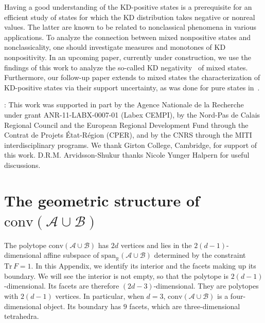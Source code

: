 \documentclass[a4paper, notitlepage, 11pt]{article}
\numberwithin{equation}{section}
\newcommand{\Acal}{{\mathcal A}}
\newcommand{\Bcal}{{\mathcal B}}
\newcommand{\spanRAB}{{\mathrm{span}_{\R}(\Acal\cup\Bcal)}}
\newcommand{\R}{\mathbb{R}}
\newcommand{\Tr}{\mathrm{Tr}\,}
\newcommand{\conv}[1]{\mathrm{conv}\left(#1\right)}
\newcommand{\convAB}{\conv{\Acal \cup \Bcal}}
\renewcommand{\thesection}{\arabic{section}}
\renewcommand{\thesubsection}{\arabic{section}.\arabic{subsection}}
\begin{document}
Having a good understanding of the KD-positive states is a prerequisite for an efficient study of states for which the KD distribution takes negative or nonreal values. The latter are known to be related to nonclassical phenomena in various applications. To analyze the connection between mixed nonpositive states and nonclassicality, one should investigate measures and monotones of KD nonpositivity. In an upcoming paper, currently under construction, we use the findings of this work to analyze the so-called KD negativity~\cite{GoHaDr19}  of mixed states. Furthermore, our follow-up paper extends to mixed states the characterization of KD-positive states via their support uncertainty, as was done for pure states in~\cite{arvidsson-shukuretal2021, debievre2021, debievre2023a}.  

 
 




\medskip
{}: 
This work was supported in part by the Agence Nationale de la Recherche under grant ANR-11-LABX-0007-01 (Labex CEMPI), by the Nord-Pas de Calais Regional Council and the European Regional Development Fund through the Contrat de Projets \'Etat-R\'egion (CPER), and by  the CNRS through the MITI interdisciplinary programs. We thank Girton College, Cambridge, for support of this work. D.R.M. Arvidsson-Shukur thanks Nicole Yunger Halpern for useful discussions.

\appendix 
\appendixpage
\renewcommand{\theequation}{\thesection.\arabic{equation}}
\renewcommand{\thesection}{\Alph{section}}
\renewcommand{\thesubsection}{\Alph{section}.\arabic{subsection}}


\section{The geometric structure of $\convAB$}\label{s:convABstructure}
The polytope $\convAB$ has $2d$ vertices and lies in the $2(d-1)$-dimensional affine subspace of $\spanRAB$ determined by the constraint $\Tr F=1$. In this Appendix, we identify its interior and the facets making up its boundary. We will see the interior is not empty, so that the polytope is $2(d-1)$-dimensional. Its facets are therefore $(2d-3)$-dimensional. They are polytopes with $2(d-1)$ vertices. 
In particular, when $d=3$, $\convAB$ is a four-dimensional object. Its boundary has $9$ facets, which are three-dimensional tetrahedra.   
\end{document}
